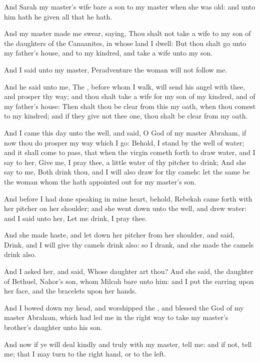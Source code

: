 \verse And Sarah my master's wife bare a son to my master when she was old: and unto him hath he given all that he hath.

\verse And my master made me swear, saying, Thou shalt not take a wife to my son of the daughters of the Canaanites, in whose land I dwell: \verse But thou shalt go unto my father's house, and to my kindred, and take a wife unto my son.

\verse And I said unto my master, Peradventure the woman will not follow me.

\verse And he said unto me, The \LORD, before whom I walk, will send his angel with thee, and prosper thy way; and thou shalt take a wife for my son of my kindred, and of my father's house: \verse Then shalt thou be clear from this my oath, when thou comest to my kindred; and if they give not thee one, thou shalt be clear from my oath.

\verse And I came this day unto the well, and said, O \LORD God of my master Abraham, if now thou do prosper my way which I go: \verse Behold, I stand by the well of water; and it shall come to pass, that when the virgin cometh forth to draw water, and I say to her, Give me, I pray thee, a little water of thy pitcher to drink; \verse And she say to me, Both drink thou, and I will also draw for thy camels: let the same be the woman whom the \LORD hath appointed out for my master's son.

\verse And before I had done speaking in mine heart, behold, Rebekah came forth with her pitcher on her shoulder; and she went down unto the well, and drew water: and I said unto her, Let me drink, I pray thee.

\verse And she made haste, and let down her pitcher from her shoulder, and said, Drink, and I will give thy camels drink also: so I drank, and she made the camels drink also.

\verse And I asked her, and said, Whose daughter art thou? And she said, the daughter of Bethuel, Nahor's son, whom Milcah bare unto him: and I put the earring upon her face, and the bracelets upon her hands.

\verse And I bowed down my head, and worshipped the \LORD, and blessed the \LORD God of my master Abraham, which had led me in the right way to take my master's brother's daughter unto his son.

\verse And now if ye will deal kindly and truly with my master, tell me: and if not, tell me; that I may turn to the right hand, or to the left.

